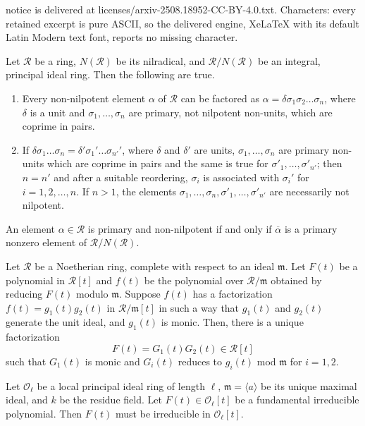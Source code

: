 \documentclass[10pt,a4paper]{amsart}
\begin{document}
notice is delivered at licenses/arxiv-2508.18952-CC-BY-4.0.txt. Characters: every retained excerpt is pure ASCII, so the delivered engine, XeLaTeX with its default Latin Modern text font, reports no missing character.
\begin{lemma}\label{lem:snap-factor}
Let $\mathscr R$ be a ring, $N(\mathscr R)$ be its nilradical, and $\mathscr R/N(\mathscr R)$ be an integral, principal ideal ring. Then the following are true.
\begin{enumerate}
\item Every non-nilpotent element $\alpha$ of $\mathscr R$ can be factored as $\alpha = \delta \sigma_1\sigma_2\ldots\sigma_n$, where $\delta$ is a unit and $\sigma_1,\ldots,\sigma_n$ are primary, not nilpotent non-units, which are coprime in pairs.
\item If $\delta \sigma_1 \ldots \sigma_n = \delta' \sigma_1' \ldots \sigma_{n'}'$, where $\delta$ and $\delta'$ are units, $\sigma_1, \ldots, \sigma_n$ are primary non-units which are coprime in pairs and the same is true for $\sigma'_1,\ldots, \sigma'_{n'}$; then $n = n'$ and after a suitable reordering, $\sigma_i$ is associated with $\sigma_i'$ for $i=1, 2, \ldots, n$. If $n> 1$, the elements $\sigma_1, \ldots,\sigma_n, \sigma'_1, \ldots, \sigma'_{n'}$ are necessarily not nilpotent.
\end{enumerate}
\end{lemma}

\begin{lemma}\label{lem:primary-modulo}
An element $\alpha\in \mathscr R$ is primary and non-nilpotent if and only if $\overline{\alpha}$ is a primary nonzero element of $\mathscr R/N(\mathscr R)$.
\end{lemma}

\begin{lemma}\label{hensel-1}
Let $\mathscr R$ be a Noetherian ring, complete with respect to an ideal $\mathfrak{m}$. Let $F(t)$ be a polynomial in $\mathscr R[t]$ and $f(t)$ be the polynomial over $\mathscr R/\mathfrak{m}$ obtained by reducing $F(t)$ modulo $\mathfrak{m}$. Suppose $f(t)$ has a factorization $f(t) = g_1(t)g_2(t)$ in $\mathscr R/\mathfrak{m}[t]$ in such a way that $g_1(t)$ and $g_2(t)$ generate the unit ideal, and $g_1(t)$ is monic. Then, there is a unique factorization $$F(t)=G_1(t)G_2(t)\in \mathscr R[t]$$ such that $G_1(t)$ is monic and $G_i(t)$ reduces to $g_i(t)$ mod $\mathfrak{m}$ for $i=1, 2$.
\end{lemma}

\begin{lemma}\label{lem:f-irred-F-irred}
Let $\mathscr O_\ell$ be a local principal ideal ring of length $\ell$, $\mathfrak{m}= \langle a\rangle$ be its unique maximal ideal, and $k$ be the residue field. Let $F(t)\in \mathscr O_\ell[t]$ be a fundamental irreducible polynomial. Then $F(t)$ must be irreducible in $\mathscr O_\ell[t]$.
\end{lemma}
\end{document}
